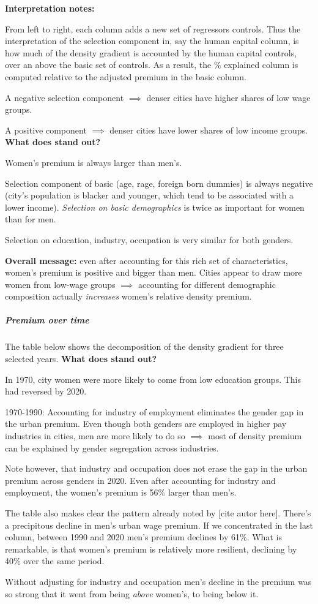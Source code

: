 \textbf{Interpretation notes:}
\bitem
	\item From left to right, each column adds a new set of regressors controls. Thus the interpretation of the selection component in, say the human capital column, is how much of the density gradient is accounted by the human capital controls, over an above the basic set of controls. As a result, the $\%$ explained column is computed relative to the adjusted premium in the basic column.
	\item A negative selection component $\implies$ denser cities have higher shares of low wage groups.
	\item A positive component $\implies$ denser cities have lower shares of low income groups.
\eitem
\textbf{What does stand out?}
\bitem
	\item Women's premium is always larger than men's.
	\item Selection component of basic (age, rage, foreign born dummies) is always negative (city's population is blacker and younger, which tend to be associated with a lower income). \textit{Selection on basic demographics} is twice as important for women than for men.
	\item Selection on education, industry, occupation is very similar for both genders.
	\item \textbf{Overall message:} even after accounting for this rich set of characteristics, women's premium is positive and bigger than men. Cities appear to draw more women from low-wage groups $\implies$ accounting for different demographic composition actually \textit{increases} women's relative density premium.
\eitem
\subparagraph{Premium over time}
The table below shows the decomposition of the density gradient for three selected years. \newline
\textbf{What does stand out?}
\bitem 
	\item In 1970, city women were more likely to come from low education groups. This had reversed by 2020.
	\item 1970-1990: Accounting for industry of employment eliminates the gender gap in the urban premium. Even though both genders are employed in higher pay industries in cities, men are more likely to do so $\implies$ most of density premium can be explained by gender segregation across industries.
	\item Note however, that industry and occupation does not erase the gap in the urban premium across genders in 2020. Even after accounting for industry and employment, the women's premium is 56\% larger than men's.
	\item The table also makes clear the pattern already noted by [cite autor here]. There's a precipitous decline in men's urban wage premium. If we concentrated in the last column, between 1990 and 2020 men's premium declines by 61\%. What is remarkable, is that women's premium is relatively more resilient, declining by 40\% over the same period.
	\item Without adjusting for industry and occupation men's decline in the premium was so strong that it went from being \textit{above} women's, to being below it.
\eitem 

